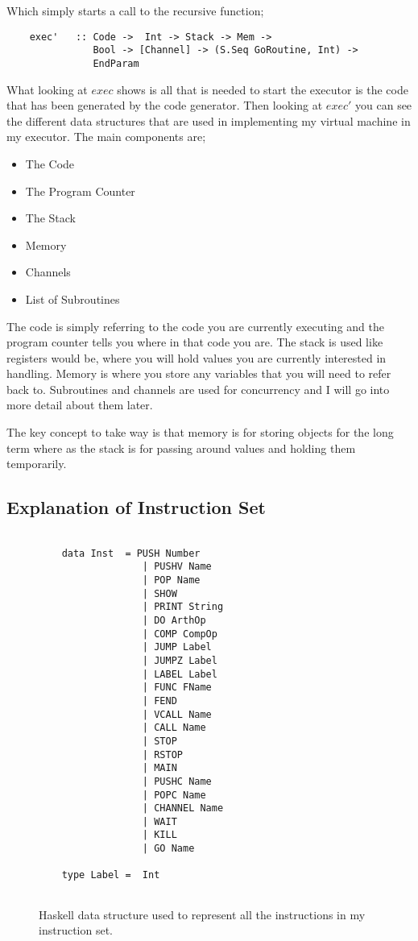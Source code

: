 Which simply starts a call to the recursive function;

\begin{lstlisting}
	exec' 	:: Code ->  Int -> Stack -> Mem -> 
	           Bool -> [Channel] -> (S.Seq GoRoutine, Int) ->  
	           EndParam
\end{lstlisting}

\newpage

What looking at $exec$ shows is all that is needed to start the executor is the code that has been generated by the code generator. Then looking at $exec'$ you can see the different data structures that are used in implementing my virtual machine in my executor. The main components are;

\begin{itemize}
\item The Code
\item The Program Counter
\item The Stack
\item Memory
\item Channels
\item List of Subroutines
\end{itemize}

The code is simply referring to the code you are currently executing and the program counter tells you where in that code you are. The stack is used like registers would be, where you will hold values you are currently interested in handling. Memory is where you store any variables that you will need to refer back to. Subroutines and channels are used for concurrency and I will go into more detail about them later. 

The key concept to take way is that memory is for storing objects for the long term where as the stack is for passing around values and holding them temporarily.

\subsection{Explanation of Instruction Set}

\begin{figure}[h]
\centering
\begin{lstlisting}

	data Inst  = PUSH Number
	              | PUSHV Name
	              | POP Name
	              | SHOW
	              | PRINT String  
      		      | DO ArthOp
       		      | COMP CompOp
       		      | JUMP Label
      		      | JUMPZ Label
      		      | LABEL Label
      		      | FUNC FName
      		      | FEND
      		      | VCALL Name
      		      | CALL Name
      		      | STOP
      		      | RSTOP
      		      | MAIN
      		      | PUSHC Name
      		      | POPC Name
      		      | CHANNEL Name
      		      | WAIT
      		      | KILL
      		      | GO Name 
	
	type Label =  Int


\end{lstlisting}
\caption{Haskell data structure used to represent all the instructions in my instruction set.}
\label{fig:instData} 
\end{figure}

